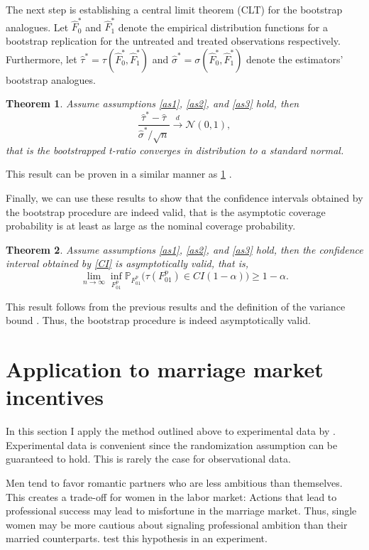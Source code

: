 \documentclass[aodsor,preprint]{imsart}
\numberwithin{equation}{section}
\theoremstyle{plain}
\newtheorem{thm}{Theorem}[section]
\begin{document}
The next step is establishing a central limit theorem (CLT) for the bootstrap analogues. Let $\widehat{F}_0^*$ and $\widehat{F}_1^*$ denote the empirical distribution functions for a bootstrap replication for the untreated and treated observations respectively. Furthermore, let $\widehat{\tau}^* = \tau(\widehat{F}_0^*, \widehat{F}_1^*)$ and $\widehat{\sigma}^* = \sigma(\widehat{F}_0^*, \widehat{F}_1^*)$ denote the estimators' bootstrap analogues.
		
\begin{thm} \label{Thm3.2}
	Assume assumptions \ref{as1}, \ref{as2}, and \ref{as3} hold, then
	$$
	\frac{\widehat{\tau}^* - \widehat{\tau}}{\widehat{\sigma}^* / \sqrt{n}} \overset{d}{\to} \mathcal{N} \left( 0, 1 \right),
	$$
	that is the bootstrapped t-ratio converges in distribution to a standard normal.
\end{thm}

This result can be proven in a similar manner as \ref{Thm3.2} \citep[see][Section 5 and Appendix C]{Imbens_2021}.

Finally, we can use these results to show that the confidence intervals obtained by the bootstrap procedure are indeed valid, that is the asymptotic coverage probability is at least as large as the nominal coverage probability.

\begin{thm}
	Assume assumptions \ref{as1}, \ref{as2}, and \ref{as3} hold, then the confidence interval obtained by \ref{CI} is asymptotically valid, that is,
	$$
	\lim_{n \to \infty} \inf_{F_{01}^p} \mathbb{P}_{F_{01}^p} \big(\tau(F_{01}^p) \in CI(1-\alpha) \big) \geq 1 - \alpha.
	$$
\end{thm}

This result follows from the previous results and the definition of the variance bound \citep[see][Corollary 5.1]{Imbens_2021}. Thus, the bootstrap procedure is indeed asymptotically valid.



\section{Application to marriage market incentives} \label{application}

In this section I apply the method outlined above to experimental data by \cite{Bursztyn_2017}. Experimental data is convenient since the randomization assumption can be guaranteed to hold. This is rarely the case for observational data. 

Men tend to favor romantic partners who are less ambitious than themselves. This creates a trade-off for women in the labor market: Actions that lead to professional success may lead to misfortune in the marriage market. Thus, single women may be more cautious about signaling professional ambition than their married counterparts. \cite{Bursztyn_2017} test this hypothesis in an experiment.
\end{document}
